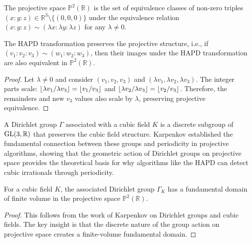 \begin{definition}
The projective space $\mathbb{P}^2(\mathbb{R})$ is the set of equivalence classes of non-zero triples $(x : y : z) \in \mathbb{R}^3 \setminus \{(0,0,0)\}$ under the equivalence relation $(x : y : z) \sim (\lambda x : \lambda y : \lambda z)$ for any $\lambda \neq 0$.
\end{definition}

\begin{proposition}\label{prop:projective_invariance}
The HAPD transformation preserves the projective structure, i.e., if $(v_1 : v_2 : v_3) \sim (w_1 : w_2 : w_3)$, then their images under the HAPD transformation are also equivalent in $\mathbb{P}^2(\mathbb{R})$.
\end{proposition}

\begin{proof}
Let $\lambda \neq 0$ and consider $(v_1, v_2, v_3)$ and $(\lambda v_1, \lambda v_2, \lambda v_3)$. The integer parts scale: $\lfloor \lambda v_1/\lambda v_3 \rfloor = \lfloor v_1/v_3 \rfloor$ and $\lfloor \lambda v_2/\lambda v_3 \rfloor = \lfloor v_2/v_3 \rfloor$. Therefore, the remainders and new $v_3$ values also scale by $\lambda$, preserving projective equivalence.
\end{proof}

\begin{definition}
A Dirichlet group $\Gamma$ associated with a cubic field $K$ is a discrete subgroup of $\operatorname{GL}(3,\mathbb{R})$ that preserves the cubic field structure. Karpenkov \cite{Karpenkov2022} established the fundamental connection between these groups and periodicity in projective algorithms, showing that the geometric action of Dirichlet groups on projective space provides the theoretical basis for why algorithms like the HAPD can detect cubic irrationals through periodicity.
\end{definition}

\begin{theorem}\label{thm:finite_domain}
For a cubic field $K$, the associated Dirichlet group $\Gamma_K$ has a fundamental domain of finite volume in the projective space $\mathbb{P}^2(\mathbb{R})$.
\end{theorem}

\begin{proof}
This follows from the work of Karpenkov \cite{Karpenkov2022} on Dirichlet groups and cubic fields. The key insight is that the discrete nature of the group action on projective space creates a finite-volume fundamental domain.
\end{proof}

